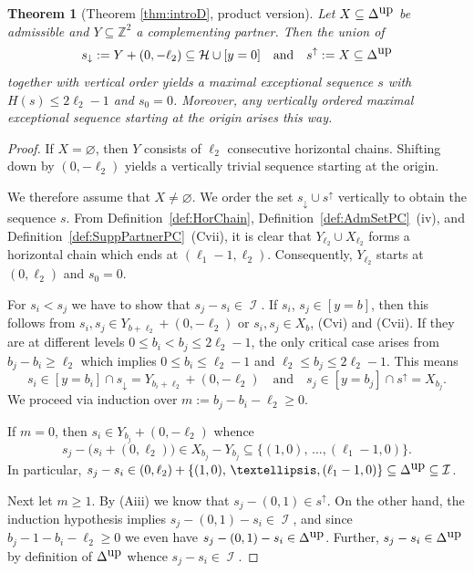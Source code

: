 \documentclass[11pt]{article}
\newtheorem{theorem}[theo]{Theorem}
\theoremstyle{definition}
\numberwithin{equation}{section}
\newcommand{\cH}{\mathcal{H}}
\newcommand{\Z}{\mathbb Z}
\newcommand{\CI}{{\mathcal I}}
\newcommand{\nImm}{\operatorname{\CI}}
\newcommand{\cl}{s}
\newcommand{\clDown}{s_{\downarrow}}
\newcommand{\clUp}{s^{\uparrow}}
\newcommand{\DeltaUp}{\Delta^{\mbox{\tiny up}}}
\newcommand{\mes}{maximal exceptional sequence}
\newcommand{\thClass}{\ref{thm:introD}}
\begin{document}
\begin{theorem}[Theorem \thClass, product 
version]
\label{thm:mesAfterAdShiftPC}
Let $X\subseteq \DeltaUp$ be 
admissible and $Y\subseteq\Z^2$ a 
complementing partner. Then the 
union of
$$
\clDown:=Y+(0,-\ell_2)\subseteq\cH
\cup[y=0]\quad\mbox{and}\quad 
\clUp:=X\subseteq\DeltaUp
$$
together with vertical order yields 
a {\mes} $\cl$ with $H(\cl)\leq2\ell_2-1$
and $\cl_0=0$. {Moreover, any
vertically ordered {\mes} starting at the origin 
arises this way.}
\end{theorem}

\begin{proof}
If $X=\varnothing$, then $Y$ consists of 
$\ell_2$ consecutive horizontal chains.
Shifting down by $(0,-\ell_2)$ yields 
a vertically trivial sequence starting 
at the origin. 

We therefore assume that $X\not=\varnothing$.
We order the set $\clDown\cup\clUp$ 
vertically to obtain the sequence $\cl$. 
From Definition~\ref{def:HorChain},
Definition~\ref{def:AdmSetPC}~(iv), and
Definition~\ref{def:SuppPartnerPC}~(Cvii), 
it is clear that $Y_{\ell_2}\cup X_{\ell_2}$ 
forms a horizontal chain which ends at 
$(\ell_1-1,\ell_2)$. Consequently, 
$Y_{\ell_2}$ starts at $(0,\ell_2)$ and
$\cl_0=0$.

For $\cl_i<\cl_j$ we have to show that 
$\cl_j-\cl_i\in\nImm$. If $\cl_i$, 
$\cl_j\in[y=b]$, then this follows from
$\cl_i,\cl_j\in Y_{b+\ell_2}+(0,-\ell_2)$ 
or $\cl_i,\cl_j\in X_b$,
(Cvi) and (Cvii). If they are at different levels 
$0\leq b_i<b_j\leq 2\ell_2-1$, the only
critical case arises from $b_j-b_i\geq \ell_2$
which implies $0\leq b_i\leq\ell_2-1$ and 
$\ell_2\leq b_j\leq2\ell_2-1$. This means
$$
\cl_i\in[y=b_i]\cap\clDown=Y_{b_i+\ell_2}+
(0,-\ell_2)\quad\mbox{and}\quad\cl_j\in[y=b_j]
\cap\clUp=X_{b_j}.
$$
We proceed via induction over $m:=b_j-b_i-
\ell_2\geq 0$. 

If $m=0$, then $\cl_i\in Y_{b_j}+(0,-\ell_2)$ 
whence
$$
\cl_j-\big(\cl_i+(0,\ell_2)\big)\in X_{b_j}-Y_{b_j}
\subseteq\{(1,0),\,\ldots, (\ell_1-1,0)\}.
$$
In particular,  
$\cl_j-\cl_i\in (0,\ell_2)+\{(1,0),\,\ldots,
(\ell_1-1,0)\}\subseteq\DeltaUp\subseteq\nImm$.

Next let $m\geq 1$. By (Aiii) we know that
$\cl_j-(0,1)\in\clUp$. On the other hand,
the induction hypothesis implies $\cl_j-(0,1)
-\cl_i\in\nImm$, and since $b_j-1-b_i-\ell_2
\geq0$ we even have $\cl_j-(0,1)-\cl_i\in
\DeltaUp$. Further, $\cl_j-\cl_i\in\DeltaUp$ 
by definition of $\DeltaUp$ whence $\cl_j-\cl_i
\in\nImm$.


\end{proof}
\end{document}

